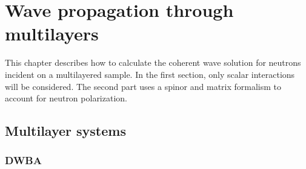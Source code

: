 

\chapter{Wave propagation through multilayers}  

This chapter describes how to calculate the coherent wave solution for neutrons incident on a multilayered sample. In the first section, only scalar interactions will be considered. The second part uses a spinor and matrix formalism to account for neutron polarization.

\section{Multilayer systems}

%

\subsection{DWBA}


